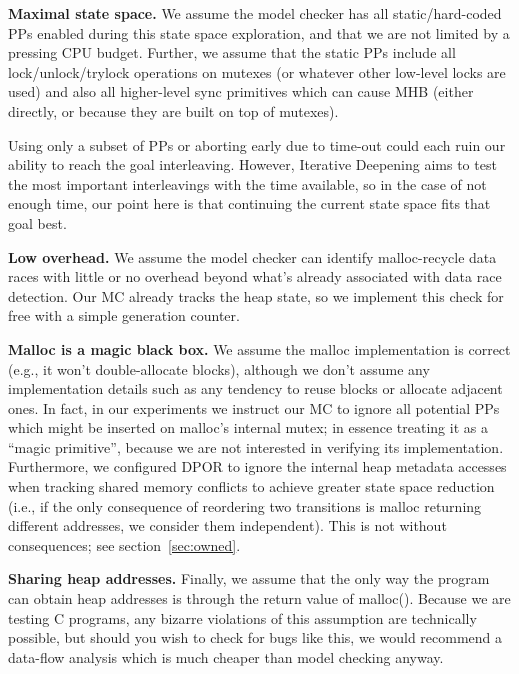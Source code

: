 \documentclass[pldi]{sigplanconf-pldi15}
\begin{document}
{\bf Maximal state space.}
We assume the model checker has all static/hard-coded PPs enabled during this state space exploration,
and that we are not limited by a pressing CPU budget.
Further, we assume that the static PPs include all lock/unlock/trylock operations on mutexes (or whatever other low-level locks are used) and also all higher-level sync primitives which can cause MHB (either directly, or because they are built on top of mutexes).

Using only a subset of PPs or aborting early due to time-out could each ruin our ability to reach the goal interleaving.
However, Iterative Deepening aims to test the most important interleavings with the time available,
so in the case of not enough time, our point here is that continuing the current state space fits that goal best.

{\bf Low overhead.}
We assume the model checker can identify malloc-recycle data races with little or no overhead beyond what's already associated with data race detection.
Our MC already tracks the heap state, so we implement this check for free with a simple generation counter.

{\bf Malloc is a magic black box.}
We assume the malloc implementation is correct (e.g., it won't double-allocate blocks), although we don't assume any implementation details such as any tendency to reuse blocks or allocate adjacent ones.
In fact, in our experiments we instruct our MC to ignore all potential PPs which might be inserted on malloc's internal mutex;
in essence treating it as a ``magic primitive'', because we are not interested in verifying its implementation.
Furthermore, we configured DPOR to ignore the internal heap metadata accesses
when tracking shared memory conflicts to achieve greater state space reduction
(i.e., if the only consequence of reordering two transitions is malloc returning different addresses, we consider them independent).
This is not without consequences; see section~\ref{sec:owned}.

{\bf Sharing heap addresses.}
Finally, we assume that the only way the program can obtain heap addresses is through the return value of malloc().
Because we are testing C programs, any bizarre violations of this assumption are technically possible,
but should you wish to check for bugs like this,
we would recommend a data-flow analysis which is much cheaper than model checking anyway.
\end{document}
